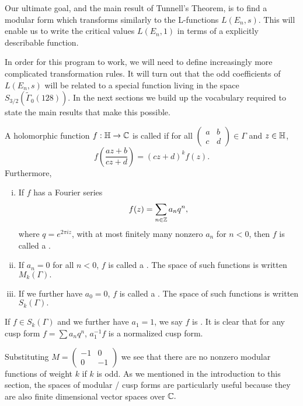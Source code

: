\documentclass[12pt, a4paper]{report}
\begin{document}
Our ultimate goal, and the main result of Tunnell's Theorem, is to
find a modular form which transforms similarly to the L-functions $L(E_n,s)$.
This will enable us to write the critical values $L(E_n,1)$ in terms of a
explicitly describable function.  

In order for this program to work, we will need to define increasingly more
complicated transformation rules. It will turn out that the odd coefficients of
$L(E_n,s)$ will be
related to a special function living in the space
$S_{3/2}(\tilde{\Gamma}_0(128)).$ In the next sections we build up the
vocabulary required to state the main results that make this possible.

\begin{defn}
  A holomorphic function $f : \mathbb{H} \rightarrow {\mathbb C}$ is called  if for all $\left(
    \begin{smallmatrix}
      a & b \\ c & d
    \end{smallmatrix}
  \right) \in \Gamma$ and $z \in \mathbb{H}$,
  \[f \left( \frac{az+b}{cz+d} \right) = (cz+d)^k f(z). \]
  Furthermore,
  \begin{enumerate}[(i)]
  \item If $f$ has a Fourier series $$f(z) = \sum\limits_{n \in {\mathbb Z}} a_n q^n,$$
    where $q = e^{2\pi i z}$, with at most finitely many nonzero $a_n$ for $n <
    0$, then $f$ is called a . 
  \item If $a_n = 0$ for all $n < 0$, $f$ is called a . The space of such functions is written $M_k(\Gamma).$
  \item If we further have $a_0 = 0$, $f$ is called a . The space of such functions is written $S_k(\Gamma).$
  \end{enumerate}
\end{defn}

\begin{remark}
  If $f \in S_k(\Gamma)$ and we further have $a_1 = 1$, we say $f$ is
  . It is clear that for any cusp form $f = \sum a_n q^n$,
  $a_1^{-1}f$ is a normalized cusp form.
\end{remark}

Substituting
$M = \left(
  \begin{smallmatrix}
    -1 & 0 \\ 0 & -1
  \end{smallmatrix}
\right)
$ we see that there are no
nonzero modular functions of weight $k$ if $k$ is odd.
As we mentioned in the introduction to this section, the spaces of modular /
cusp forms are particularly useful because they are also finite dimensional
vector spaces over ${\mathbb C}.$
\end{document}
